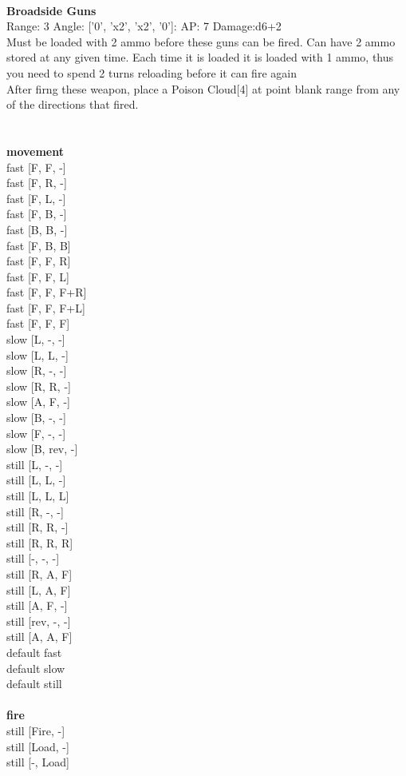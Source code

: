 \ \\
{\bf Broadside Guns } \\



Range: 3  Angle: ['0', 'x2', 'x2', '0']: AP: 7 Damage:d6+2 \\
Must be loaded with 2 ammo before these guns can be fired. Can have 2 ammo stored at any given time. Each time it is loaded it is loaded with 1 ammo, thus you need to spend 2 turns reloading before it can fire again\\ 
After firng these weapon, place a Poison Cloud[4] at point blank range from any of the directions that fired.\\ 




 
\ \\



\ \\ {\bf movement } \\
fast [F, F, -] \\
fast [F, R, -] \\
fast [F, L, -] \\
fast [F, B, -] \\
fast [B, B, -] \\
fast [F, B, B] \\
fast [F, F, R] \\
fast [F, F, L] \\
fast [F, F, F+R] \\
fast [F, F, F+L] \\
fast [F, F, F] \\
slow [L, -, -] \\
slow [L, L, -] \\
slow [R, -, -] \\
slow [R, R, -] \\
slow [A, F, -] \\
slow [B, -, -] \\
slow [F, -, -] \\
slow [B, rev, -] \\
still [L, -, -] \\
still [L, L, -] \\
still [L, L, L] \\
still [R, -, -] \\
still [R, R, -] \\
still [R, R, R] \\
still [-, -, -] \\
still [R, A, F] \\
still [L, A, F] \\
still [A, F, -] \\
still [rev, -, -] \\
still [A, A, F] \\
default fast \\
default slow \\
default still \\
\ \\ {\bf fire } \\
still [Fire, -] \\
still [Load, -] \\
still [-, Load] \\


